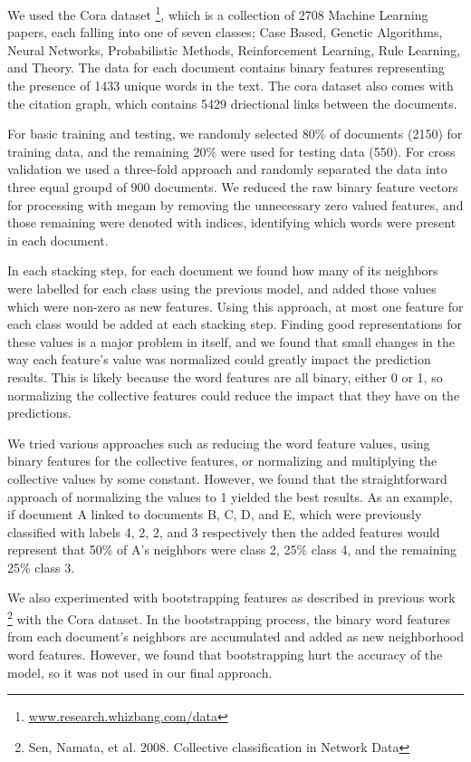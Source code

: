 \documentclass[a4paper,11pt]{article}
\begin{document}
We used the Cora dataset \footnote{\url{www.research.whizbang.com/data}}, which is a collection of
2708 Machine Learning papers, each falling into one of seven
classes; Case Based, Genetic Algorithms, Neural Networks,
Probabilistic Methods, Reinforcement Learning, Rule Learning,
and Theory. The data for each document contains binary features representing
the presence of 1433 unique words in the text. The cora dataset 
also comes with the citation graph, 
which contains 5429 driectional links between the documents.

For basic training and testing, we randomly selected 80\% of documents (2150) 
for training data, and the remaining 20\% were used for testing data (550).
For cross validation we used a three-fold approach and randomly separated 
the data into three equal groupd of 900 documents. 
We reduced the raw binary feature vectors for processing with megam
by removing the unnecessary zero valued features, and those remaining 
were denoted with indices, identifying which words were present in each document.

In each stacking step, for each document we found how many of its
neighbors were labelled for each class using the previous model, and added 
those values which were non-zero as new features. Using this approach,
at most one feature for each class would be added at each stacking step.
Finding good representations for these values is a major problem in itself,
and we found that small changes in the way each feature's value was normalized
could greatly impact the prediction results. This is likely because the word
features are all binary, either 0 or 1, so normalizing the collective features
could reduce the impact that they have on the predictions.

We tried various approaches such as reducing the word feature 
values, using binary features for the collective features, or normalizing 
and multiplying the collective values by some constant. However, we found
that the straightforward approach of normalizing the values to 1 yielded 
the best results. As an example, if document A linked to documents 
B, C, D, and E, which were previously classified with labels 4, 2, 2, and 3
respectively then the added features would represent that 50\% of A's neighbors 
were class 2, 25\% class 4, and the remaining 25\% class 3. 

We also experimented with bootstrapping features as described in previous work
\footnote{Sen, Namata, et al. 2008. Collective classification in Network Data}
with the Cora dataset. In the bootstrapping process, the binary word features from
each document's neighbors are accumulated and added as new neighborhood word features.
However, we found that bootstrapping hurt the accuracy of the model, so it 
was not used in our final approach.
\end{document}
